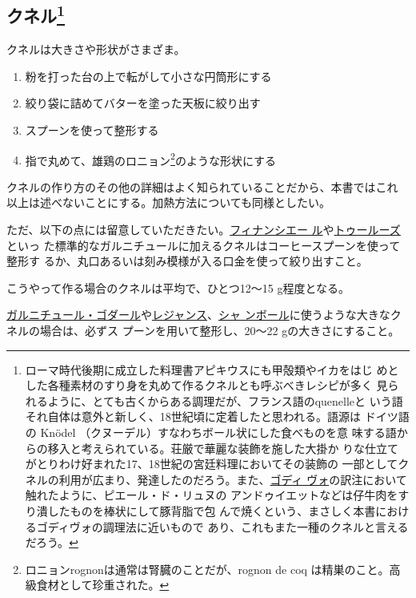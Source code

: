\hypertarget{ux30afux30cdux30eb54}{%
\subsection[クネル]{\texorpdfstring{クネル\footnote{ローマ時代後期に成立した料理書アピキウスにも甲殻類やイカをはじ
  めとした各種素材のすり身を丸めて作るクネルとも呼ぶべきレシピが多く
  見られるように、とても古くからある調理だが、フランス語のquenelleと
  いう語それ自体は意外と新しく、18世紀頃に定着したと思われる。語源は
  ドイツ語の Knödel （クヌーデル）すなわちボール状にした食べものを意
  味する語からの移入と考えられている。荘厳で華麗な装飾を施した大掛か
  りな仕立てがとりわけ好まれた17、18世紀の宮廷料理においてその装飾の
  一部としてクネルの利用が広まり、発達したのだろう。また、\protect\hyperlink{godiveau}{ゴディ
  ヴォ}の訳注において触れたように、ピエール・ド・リュヌの
  アンドゥイエットなどは仔牛肉をすり潰したものを棒状にして豚背脂で包
  んで焼くという、まさしく本書におけるゴディヴォの調理法に近いもので
  あり、これもまた一種のクネルと言えるだろう。}}{クネル}}\label{ux30afux30cdux30eb54}}


クネルは大きさや形状がさまざま。

\begin{enumerate}
\def\labelenumi{\arabic{enumi}.}
\item
  粉を打った台の上で転がして小さな円筒形にする
\item
  絞り袋に詰めてバターを塗った天板に絞り出す
\item
  スプーンを使って整形する
\item
  指で丸めて、雄鶏のロニョン\footnote{ロニョンrognonは通常は腎臓のことだが、rognon
    de coq は精巣のこと。高級食材として珍重された。}のような形状にする
\end{enumerate}

クネルの作り方のその他の詳細はよく知られていることだから、本書ではこれ
以上は述べないことにする。加熱方法についても同様としたい。

ただ、以下の点には留意していただきたい。\protect\hyperlink{garniture-financiere}{フィナンシエー
ル}や\protect\hyperlink{garniture-toulouse}{トゥールーズ}といっ
た標準的なガルニチュールに加えるクネルはコーヒースプーンを使って整形す
るか、丸口あるいは刻み模様が入る口金を使って絞り出すこと。

こうやって作る場合のクネルは平均で、ひとつ12〜15 g程度となる。

\protect\hyperlink{garniture-godard}{ガルニチュール・ゴダール}や\protect\hyperlink{garniture-regence}{レジャンス}、\protect\hyperlink{garniture-chambole}{シャ
ンボール}に使うような大きなクネルの場合は、必ずス
プーンを用いて整形し、20〜22 gの大きさにすること。


